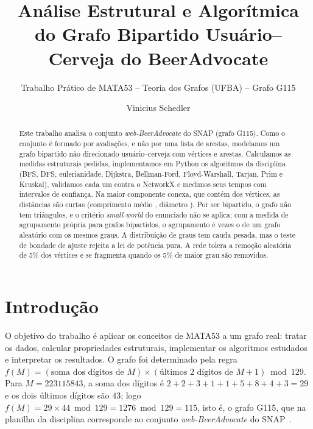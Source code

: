 \documentclass[sigconf]{webmedia}
\begin{document}
\title{Análise Estrutural e Algorítmica do Grafo Bipartido Usuário--Cerveja do BeerAdvocate}
\subtitle{Trabalho Prático de MATA53 -- Teoria dos Grafos (UFBA) -- Grafo G115}

\author{Vinicius Schedler}

\renewcommand{\shortauthors}{V. Schedler}

\begin{abstract}
Este trabalho analisa o conjunto \textit{web-BeerAdvocate} do SNAP (grafo G115). Como o conjunto
é formado por avaliações, e não por uma lista de arestas, modelamos um grafo bipartido não
direcionado usuário--cerveja com \NVertices{} vértices e \NArestas{} arestas. Calculamos as
medidas estruturais pedidas, implementamos em Python os algoritmos da disciplina (BFS, DFS,
eulerianidade, Dijkstra, Bellman-Ford, Floyd-Warshall, Tarjan, Prim e Kruskal), validamos cada
um contra o NetworkX e medimos seus tempos com intervalos de confiança. Na maior componente
conexa, que contém \MCCPercent{} dos vértices, as distâncias são curtas (comprimento médio
\LExato{}, diâmetro \Diametro{}). Por ser bipartido, o grafo não tem triângulos, e o critério
\textit{small-world} do enunciado não se aplica; com a medida de agrupamento própria para grafos
bipartidos, o agrupamento é \LatapyRazao{} vezes o de um grafo aleatório com os mesmos graus. A
distribuição de graus tem cauda pesada, mas o teste de bondade de ajuste rejeita a lei de
potência pura. A rede tolera a remoção aleatória de 5\% dos vértices e se fragmenta quando os
5\% de maior grau são removidos.
\end{abstract}


\maketitle

\section{Introdução}

O objetivo do trabalho é aplicar os conceitos de MATA53 a um grafo real: tratar os dados,
calcular propriedades estruturais, implementar os algoritmos estudados e interpretar os
resultados. O grafo foi determinado pela regra
$f(M) = (\text{soma dos dígitos de } M)\times(\text{últimos 2 dígitos de } M + 1) \bmod 129$.
Para $M = 223115843$, a soma dos dígitos é $2+2+3+1+1+5+8+4+3 = 29$ e os dois últimos
dígitos são $43$; logo $f(M) = 29 \times 44 \bmod 129 = 1276 \bmod 129 = 115$, isto é,
o grafo G115, que na planilha da disciplina corresponde ao conjunto \textit{web-BeerAdvocate}
do SNAP~\cite{snap,mcauley2012,mcauley2013}.
\end{document}
